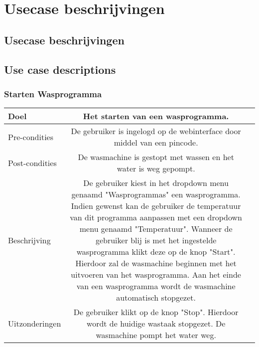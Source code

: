 \chapter{Usecase beschrijvingen}
\section{Usecase beschrijvingen}

\section{Use case descriptions}
\subsection{Starten Wasprogramma}

\begin{center}
  \begin{tabular}{ l | c | r | }
    \hline
    Doel & Het starten van een wasprogramma. \\ \hline
    Pre-condities & De gebruiker is ingelogd op de webinterface door middel van een pincode. \\ \hline
    Post-condities & De wasmachine is gestopt met wassen en het water is weg gepompt. \\ \hline
    Beschrijving & De gebruiker kiest in het dropdown menu genaamd "Wasprogrammas" een wasprogramma. Indien gewenst kan de gebruiker de temperatuur van dit programma aanpassen met een dropdown menu genaamd "Temperatuur". Wanneer de gebruiker blij is met het ingestelde wasprogramma klikt deze op de knop "Start". Hierdoor zal de wasmachine beginnen met het uitvoeren van het wasprogramma. Aan het einde van een wasprogramma wordt de wasmachine automatisch stopgezet.\\ \hline
	Uitzonderingen & De gebruiker klikt op de knop "Stop". Hierdoor wordt de huidige wastaak stopgezet. De wasmachine pompt het water weg. \\
    \hline
  \end{tabular}
\end{center}